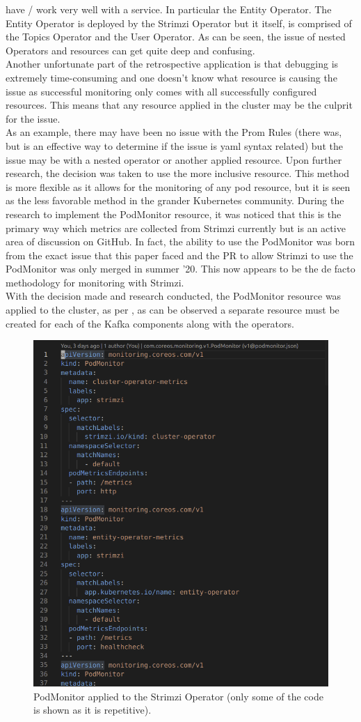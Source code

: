 have / work very well with a service. In particular the Entity Operator. The Entity Operator is deployed by the Strimzi Operator but it itself, is
comprised of the Topics Operator and the User Operator. As can be seen, the issue of nested Operators and resources can get quite deep and confusing. \\
Another unfortunate part of the retrospective application is that debugging is extremely time-consuming and one doesn't know what resource
is causing the issue as successful monitoring only comes with all successfully configured resources. This means that any resource applied in the
cluster may be the culprit for the issue. \\ As an example, there may have been no issue with the Prom Rules (there was, but  is an
effective way to determine if the issue is yaml syntax related) but the issue may be with a nested operator or another applied resource.
\bigbreak
Upon further research, the decision was taken to use the more inclusive  resource. This method is more flexible as it allows for
the monitoring of any pod resource, but it is seen as the less favorable method in the grander Kubernetes community.
During the research to implement the PodMonitor resource, it was noticed that this is the primary way which metrics are collected from Strimzi
currently but is an active area of discussion on GitHub.
In fact, the ability to use the PodMonitor was born from the exact issue that this paper faced and the PR to allow Strimzi to use the PodMonitor
was only merged in summer '20\autocite{UsingPodMonitorScraping}. This now appears to be the de facto methodology for monitoring with Strimzi.\\
With the decision made and research conducted, the PodMonitor resource was applied to the cluster, as per ,
as can be observed a separate  resource must be created for each of the Kafka components along with the operators.
\begin{figure}[H]
	\centering
	\includegraphics[width=0.7\linewidth]{figures/pod_monitor_strimzi.png}
	\caption[Strimzi PodMonitor]{PodMonitor applied to the Strimzi Operator (only some of the code is shown as it is repetitive).}
	\label{fig:pod_monitor_strimzi}
\end{figure}
